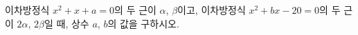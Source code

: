 이차방정식 $x^2+x+a=0$의 두 근이 $\alpha$, $\beta$이고, 이차방정식 $x^2+bx-20=0$의 두 근이 $2\alpha$, $2\beta$일 때, 상수 $a$, $b$의 값을 구하시오.
